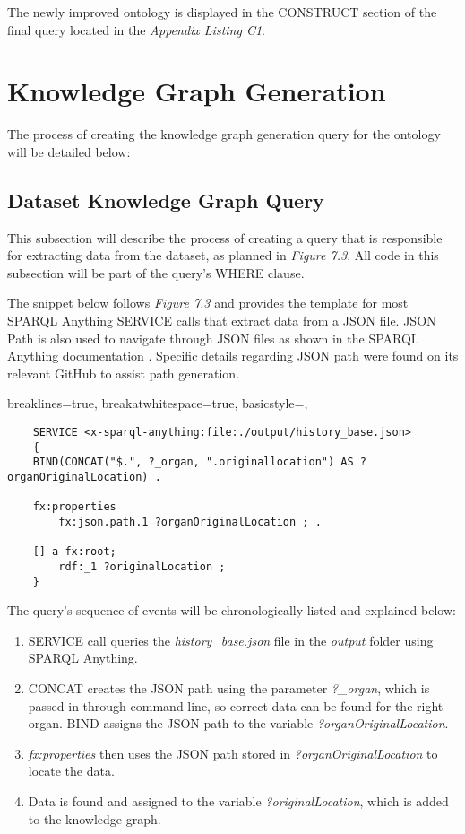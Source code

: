 The newly improved ontology is displayed in the CONSTRUCT section of the final query located in the \textit{Appendix Listing C1}.

\section{Knowledge Graph Generation}
\hspace*{0.5cm} The process of creating the knowledge graph generation query for the ontology will be detailed below:

\subsection{Dataset Knowledge Graph Query}
\hspace*{0.5cm} This subsection will describe the process of creating a query that is responsible for extracting data from the dataset, as planned in \textit{Figure 7.3}. All code in this subsection will be part of the query's WHERE clause. 

The snippet below follows \textit{Figure 7.3} and provides the template for most SPARQL Anything SERVICE calls that extract data from a JSON file. JSON Path is also used to navigate through JSON files as shown in the SPARQL Anything documentation \cite{sparqlanythinggithub}. Specific details regarding JSON path were found on its relevant GitHub \cite{jsonpath} to assist path generation. 

\lstset
{
    breaklines=true,
    breakatwhitespace=true,
    basicstyle=\linespread{1.25}\ttfamily,
}
\begin{lstlisting}
    SERVICE <x-sparql-anything:file:./output/history_base.json> 
    {
    BIND(CONCAT("$.", ?_organ, ".originallocation") AS ?organOriginalLocation) .

    fx:properties
        fx:json.path.1 ?organOriginalLocation ; .

    [] a fx:root; 
        rdf:_1 ?originalLocation ;
    } 
\end{lstlisting}

\noindent The query's sequence of events will be chronologically listed and explained below:

\begin{enumerate}
    \item SERVICE call queries the \textit{history\_base.json} file in the \textit{output} folder using SPARQL Anything. 
    \item CONCAT creates the JSON path using the parameter \textit{?\_organ}, which is passed in through command line, so correct data can be found for the right organ. BIND assigns the JSON path to the variable \textit{?organOriginalLocation}.
    \item \textit{fx:properties} then uses the JSON path stored in \textit{?organOriginalLocation} to locate the data.
    \item Data is found and assigned to the variable \textit{?originalLocation}, which is added to the knowledge graph.
\end{enumerate}

